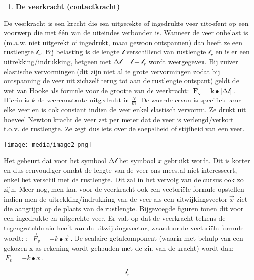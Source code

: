 \documentclass{ximera}
\begin{document}
\begin{enumerate}
\def\labelenumi{\arabic{enumi}.}
\setcounter{enumi}{1}
\item
  \textbf{De veerkracht (contactkracht)}
\end{enumerate}

De veerkracht is een kracht die een uitgerekte of ingedrukte veer
uitoefent op een voorwerp die met één van de uiteindes verbonden is.
Wanneer de veer onbelast is (m.a.w. niet uitgerekt of ingedrukt, maar
gewoon ontspannen) dan heeft ze een rustlengte \(\mathcal{l}_{r}\). Bij
belasting is de lengte \(\mathcal{l}\) verschillend van rustlengte
\(\mathcal{l}_{r}\) en is er een uitrekking/indrukking, hetgeen met
\(\mathcal{\mathrm{\Delta}l = l -}\mathcal{l}_{r}\) wordt weergegeven.
Bij zuiver elastische vervormingen (dit zijn niet al te grote
vervormingen zodat bij ontspanning de veer uit zichzelf terug tot aan de
rustlengte ontspant) geldt de wet van Hooke als formule voor de grootte
van de veerkracht:
\(\mathbf{\ F}_{\mathbf{v}}\mathbf{= k \bullet}\left| \mathcal{\mathrm{\Delta}l} \right|\mathbf{\ }\).
Hierin is \(k\) de veerconstante uitgedrukt in \(\frac{N}{m}\). De
waarde ervan is specifiek voor elke veer en is ook constant indien de
veer enkel elastisch vervormt. Ze drukt uit hoeveel Newton kracht de
veer zet per meter dat de veer is verlengd/verkort t.o.v. de rustlengte.
Ze zegt dus iets over de soepelheid of stijfheid van een veer.

\texttt{[image: media/image2.png]}

Het gebeurt dat voor het symbool \(\mathcal{\mathrm{\Delta}l}\) het
symbool \(x\) gebruikt wordt. Dit is korter en dus eenvoudiger omdat de
lengte van de veer ons meestal niet interesseert, enkel het verschil met
de rustlengte. Dit zal in het vervolg van de cursus ook zo zijn. Meer
nog, men kan voor de veerkracht ook een vectoriële formule opstellen
indien men de uitrekking/indrukking van de veer als een
uitwijkingsvector \(\overrightarrow{x}\) ziet die aangrijpt op de plaats
van de rustlengte. Bijgevoegde figuren tonen dit voor een ingedrukte en
uitgerekte veer. Er valt op dat de veerkracht telkens de tegengestelde
zin heeft van de uitwijkingsvector, waardoor de vectoriële formule
wordt: :
\(\ {\ \overrightarrow{F}}_{v} = - k \bullet \overrightarrow{x}\ \). De
scalaire getalcomponent (waarin met behulp van een gekozen x-as rekening
wordt gehouden met de zin van de kracht) wordt dan:
\({\ F}_{v} = - k \bullet x\ \).

\[\mathcal{l}_{r}\]
\end{document}
